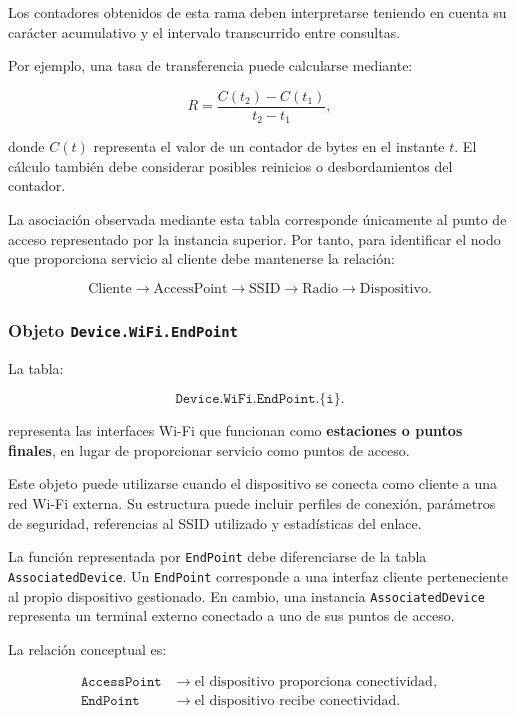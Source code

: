 Los contadores obtenidos de esta rama deben interpretarse teniendo en
cuenta su carácter acumulativo y el intervalo transcurrido entre
consultas.

Por ejemplo, una tasa de transferencia puede calcularse mediante:

\[
    R =
    \frac{
        C(t_2)-C(t_1)
    }{
        t_2-t_1
    },
\]

donde \(C(t)\) representa el valor de un contador de bytes en el instante
\(t\). El cálculo también debe considerar posibles reinicios o
desbordamientos del contador.

La asociación observada mediante esta tabla corresponde únicamente al
punto de acceso representado por la instancia superior. Por tanto, para
identificar el nodo que proporciona servicio al cliente debe mantenerse
la relación:

\[
    \text{Cliente}
    \longrightarrow
    \text{AccessPoint}
    \longrightarrow
    \text{SSID}
    \longrightarrow
    \text{Radio}
    \longrightarrow
    \text{Dispositivo}.
\]


\subsubsection*{Objeto \texttt{Device.WiFi.EndPoint}}

La tabla:

\[
    \texttt{Device.WiFi.EndPoint.\{i\}.}
\]

representa las interfaces Wi-Fi que funcionan como
\textbf{estaciones o puntos finales}, en lugar de proporcionar servicio
como puntos de acceso.

Este objeto puede utilizarse cuando el dispositivo se conecta como
cliente a una red Wi-Fi externa. Su estructura puede incluir perfiles de
conexión, parámetros de seguridad, referencias al SSID utilizado y
estadísticas del enlace.

La función representada por \texttt{EndPoint} debe diferenciarse de la
tabla \texttt{AssociatedDevice}. Un \texttt{EndPoint} corresponde a una
interfaz cliente perteneciente al propio dispositivo gestionado. En
cambio, una instancia \texttt{AssociatedDevice} representa un terminal
externo conectado a uno de sus puntos de acceso.

La relación conceptual es:

\[
\begin{aligned}
    \texttt{AccessPoint}
    &\longrightarrow
    \text{el dispositivo proporciona conectividad},\\
    \texttt{EndPoint}
    &\longrightarrow
    \text{el dispositivo recibe conectividad}.
\end{aligned}
\]

